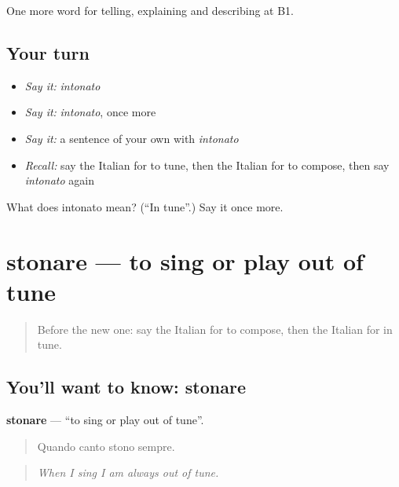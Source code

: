 \begin{grammarlens}[title={What you've built}]
One more word for telling, explaining and describing at B1.
\end{grammarlens}

\subsection*{Your turn}
\begin{itemize}
\raggedright
  \item \emph{Say it:} \emph{intonato}
  \item \emph{Say it:} \emph{intonato}, once more
  \item \emph{Say it:} a sentence of your own with \emph{intonato}
  \item \emph{Recall:} say the Italian for to tune, then the Italian for to compose, then say \emph{intonato} again
\end{itemize}

\begin{tcolorbox}[breakable,colback=teal!4,colframe=teal!35!black,title={Before you move on}]
What does intonato mean? (\textquotedblleft{}In tune\textquotedblright{}.) Say it once more.
\end{tcolorbox}
\section[stonare]{stonare — to sing or play out of tune}

\label{lesson:IT-C518-stonare}



\begin{quote}
Before the new one: say the Italian for to compose, then the Italian for in tune.
\end{quote}

\subsection*{You'll want to know: stonare}
\textbf{stonare} — \textquotedblleft{}to sing or play out of tune\textquotedblright{}.

\begin{quote}
Quando canto stono sempre.
\end{quote}

\begin{quote}
\emph{When I sing I am always out of tune.}
\end{quote}

